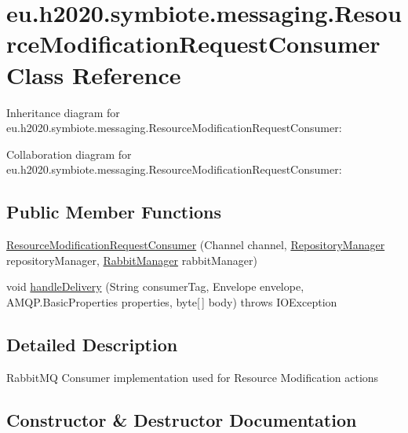 \hypertarget{classeu_1_1h2020_1_1symbiote_1_1messaging_1_1ResourceModificationRequestConsumer}{}\section{eu.\+h2020.\+symbiote.\+messaging.\+Resource\+Modification\+Request\+Consumer Class Reference}
\label{classeu_1_1h2020_1_1symbiote_1_1messaging_1_1ResourceModificationRequestConsumer}


Inheritance diagram for eu.\+h2020.\+symbiote.\+messaging.\+Resource\+Modification\+Request\+Consumer\+:


Collaboration diagram for eu.\+h2020.\+symbiote.\+messaging.\+Resource\+Modification\+Request\+Consumer\+:
\subsection*{Public Member Functions}
\begin{DoxyCompactItemize}
\item 
\hyperlink{classeu_1_1h2020_1_1symbiote_1_1messaging_1_1ResourceModificationRequestConsumer_a9edfd7dcca58ed1988bd26d9dd913191}{Resource\+Modification\+Request\+Consumer} (Channel channel, \hyperlink{classeu_1_1h2020_1_1symbiote_1_1repository_1_1RepositoryManager}{Repository\+Manager} repository\+Manager, \hyperlink{classeu_1_1h2020_1_1symbiote_1_1messaging_1_1RabbitManager}{Rabbit\+Manager} rabbit\+Manager)
\item 
void \hyperlink{classeu_1_1h2020_1_1symbiote_1_1messaging_1_1ResourceModificationRequestConsumer_a814265326818232c50a1b91a4b6e347b}{handle\+Delivery} (String consumer\+Tag, Envelope envelope, A\+M\+Q\+P.\+Basic\+Properties properties, byte\mbox{[}$\,$\mbox{]} body)  throws I\+O\+Exception 
\end{DoxyCompactItemize}


\subsection{Detailed Description}
Rabbit\+MQ Consumer implementation used for Resource Modification actions 

\subsection{Constructor \& Destructor Documentation}
